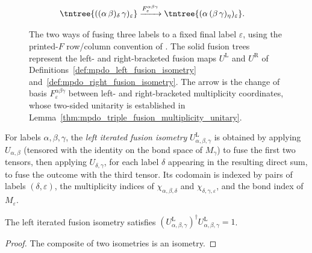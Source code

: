 \begin{figure}[ht]
    \centering
    \begin{align}
        \tntree{((\alpha\,\beta)_\delta\,\gamma)_\varepsilon}
         & \xrightarrow{F_{\varepsilon}^{\alpha\beta\gamma}}
        \tntree{(\alpha\,(\beta\,\gamma)_\eta)_\varepsilon}.
        \notag
    \end{align}
    \caption{The two ways of fusing three labels to a fixed final label
        $\varepsilon$, using the printed-$F$ row/column convention of
        \cite[Section~3.4]{Bultinck2017Anyons}. The solid fusion trees represent
        the left- and right-bracketed fusion maps $U^{\mathrm L}$ and $U^{\mathrm R}$ of
        Definitions~\ref{def:mpdo_left_fusion_isometry} and~\ref{def:mpdo_right_fusion_isometry}.
        The arrow is the change of basis $F_{\varepsilon}^{\alpha\beta\gamma}$
        between left- and right-bracketed multiplicity coordinates, whose
        two-sided unitarity is established in
        Lemma~\ref{thm:mpdo_triple_fusion_multiplicity_unitary}.}
    \label{fig:mpdo_fixed_final_fusion_bracketings}
\end{figure}

\begin{definition}%
    \label{def:mpdo_left_fusion_isometry}
    \leanok
    For labels $\alpha, \beta, \gamma$, the \emph{left iterated fusion
        isometry} $U^{\mathrm L}_{\alpha,\beta,\gamma}$ is obtained by applying
    $U_{\alpha,\beta}$ (tensored with the identity on the bond space of
    $M_\gamma$) to fuse the first two tensors, then applying $U_{\delta,\gamma}$,
    for each label $\delta$ appearing in the resulting direct sum, to fuse
    the outcome with the third tensor. Its codomain is indexed by pairs of
    labels $(\delta, \varepsilon)$, the multiplicity indices of
    $\chi_{\alpha,\beta,\delta}$ and $\chi_{\delta,\gamma,\varepsilon}$,
    and the bond index of $M_\varepsilon$.
\end{definition}

\begin{lemma}%
    \label{thm:mpdo_left_fusion_isometry_isometry}
    \leanok
    The left iterated fusion isometry satisfies
    $(U^{\mathrm L}_{\alpha,\beta,\gamma})^\dagger
        U^{\mathrm L}_{\alpha,\beta,\gamma}=1$.
\end{lemma}
\begin{proof}\leanok
    The composite of two isometries is an isometry.
\end{proof}

